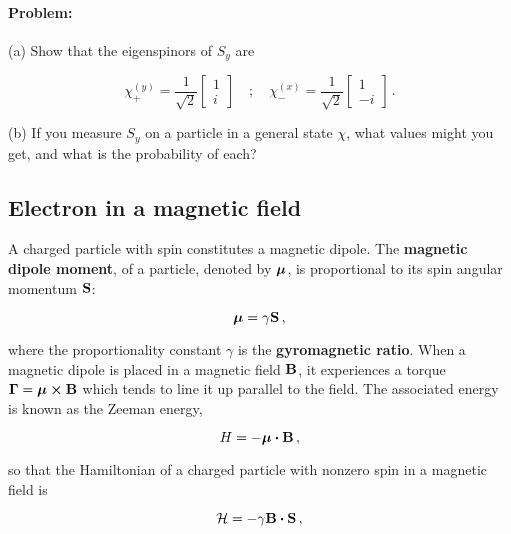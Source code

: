 \documentclass[12pt, titlepage]{article}
\begin{document}
\begin{mdframed}[backgroundcolor=gray!20]
\paragraph*{Problem:} (a) Show that the eigenspinors of $S_y$ are 

\begin{equation}
\chi_+^{(y)} = \frac{1}{\sqrt{2}}\begin{bmatrix} 1 \\ i\end{bmatrix} \quad;\quad \chi_-^{(x)} = \frac{1}{\sqrt{2}}\begin{bmatrix} 1 \\ -i \end{bmatrix} \,.
\end{equation}

(b) If you measure $S_y$ on a particle in a general state $\chi$, what values might you get, and what is the probability of each?
\end{mdframed}

\subsection{Electron in a magnetic field}
A charged particle with spin constitutes a magnetic dipole. The \textbf{magnetic dipole moment}, of a particle, denoted by $\vb*{\mu}$, is proportional to its spin angular momentum $\vb{S}$:

\begin{equation}
    \vb*{\mu} = \gamma \vb{S} \,,
\end{equation}

where the proportionality constant $\gamma$ is the \textbf{gyromagnetic ratio}. When a magnetic dipole is placed in a magnetic field $\vb{B}$, it experiences a torque $\vb{\Gamma} = \vb*{\mu}\cross\vb{B}$ which tends to line it up parallel to the field. The associated energy is known as the Zeeman energy,

\begin{equation}
	H = -\vb*{\mu}\vdot\vb{B} \,,
\end{equation}

so that the Hamiltonian of a charged particle with nonzero spin in a magnetic field is

\begin{equation}
	\mathcal{H} = -\gamma\vb{B}\vdot\vb{S} \,,
\end{equation}
\end{document}
